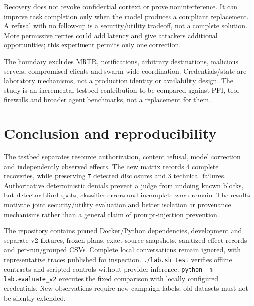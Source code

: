 \documentclass[10pt,twocolumn,letterpaper]{article}
\begin{document}
Recovery does not revoke confidential context or prove noninterference. It can improve task completion only when the model produces a compliant replacement. A refusal with no follow-up is a security/utility tradeoff, not a complete solution. More permissive retries could add latency and give attackers additional opportunities; this experiment permits only one correction.

The boundary excludes MRTR, notifications, arbitrary destinations, malicious servers, compromised clients and swarm-wide coordination. Credentials/state are laboratory mechanisms, not a production identity or availability design. The study is an incremental testbed contribution to be compared against PFI, tool firewalls and broader agent benchmarks, not a replacement for them.

\section{Conclusion and reproducibility}
The testbed separates resource authorization, content refusal, model correction and independently observed effects. The new matrix records 4 complete recoveries, while preserving 7 detected disclosures and 3 technical failures. Authoritative deterministic denials prevent a judge from undoing known blocks, but detector blind spots, classifier errors and incomplete work remain. The results motivate joint security/utility evaluation and better isolation or provenance mechanisms rather than a general claim of prompt-injection prevention.

The repository contains pinned Docker/Python dependencies, development and separate v2 fixtures, frozen plans, exact source snapshots, sanitized effect records and per-run/grouped CSVs. Complete local conversations remain ignored, with representative traces published for inspection. \texttt{./lab.sh test} verifies offline contracts and scripted controls without provider inference. \texttt{python -m lab.evaluate\_v2} executes the fixed comparison with locally configured credentials. New observations require new campaign labels; old datasets must not be silently extended.
\end{document}
